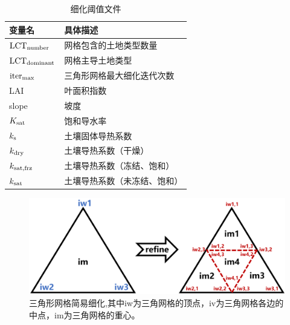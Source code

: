 {
  \begin{table}[htbp]
    \centering
    \caption{细化阈值文件}
    \label{tab:细化阈值文件}
    \begin{tabular}{@{}ll@{}}
      \toprule
      变量名                       & 具体描述                     \\ \midrule
      ${\rm LCT}_{\rm number}$     & 网格包含的土地类型数量       \\
      ${\rm LCT}_{\rm dominant}$   & 网格主导土地类型             \\
      ${\rm iter}_{\rm max}$       & 三角形网格最大细化迭代次数   \\
      LAI                          & 叶面积指数                   \\
      slope                        & 坡度                         \\
      $K_{\rm sat}$                & 饱和导水率                   \\
      $k_{\rm s}$                  & 土壤固体导热系数             \\
      $k_{\rm dry}$                & 土壤导热系数（干燥）         \\
      $k_{\rm sat,frz}$            & 土壤导热系数（冻结、饱和）   \\
      $k_{\rm sat}$                & 土壤导热系数（未冻结、饱和） \\ \bottomrule
    \end{tabular}
  \end{table}
}

{
  \begin{figure}[htbp]
    \centering
    \includegraphics[width=\textwidth]{Figures/模式构架/三角形网格简易细化.png}
    \caption{三角形网格简易细化,其中iw为三角网格的顶点，iv为三角网格各边的中点，im为三角网格的重心。}
    \label{fig:三角形网格简易细化}
  \end{figure}
}

